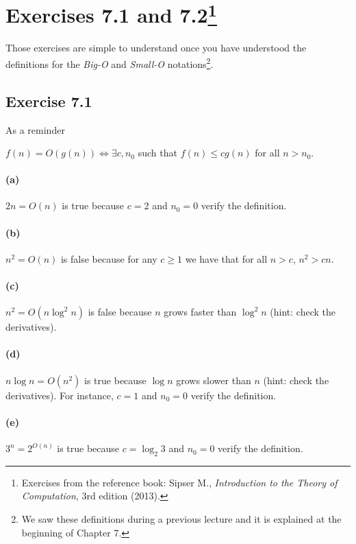 \section{Exercises 7.1 and 7.2\footnote{Exercises from the reference book: Sipser M.,
\emph{Introduction to the Theory of Computation}, 3rd edition (2013).}}
Those exercises are simple to understand once you have understood the definitions for the
\emph{Big-O} and \emph{Small-O} notations\footnote{We saw these definitions
during a previous lecture and it is explained at the beginning of Chapter 7.}.

\subsection{Exercise 7.1}
As a reminder
\begin{definition}
	\(f(n) = O(g(n)) \iff \exists c, n_0\) such that \(f(n) \le c g(n)\) for
	all \(n > n_0\).
\end{definition}

\paragraph{(a)}
\(2n = O(n)\)
is true because \(c = 2\) and \(n_0 = 0\) verify the definition.

\paragraph{(b)}
\(n^2 = O(n)\)
is false because for any \(c \ge 1\) we have that for all \(n > c\), \(n^2 > cn\).

\paragraph{(c)}
\(n^2 = O(n \log^2 n)\)
is false because $n$ grows faster than $\log^2 n$ (hint: check the derivatives).

\paragraph{(d)}
\(n \log n = O(n^2)\)
is true because $\log n$ grows slower than $n$ (hint: check the derivatives).
For instance, \(c = 1\) and \(n_0 = 0\) verify the definition.

\paragraph{(e)}
\(3^n = 2^{O(n)}\)
is true because \(c = \log_2 3\) and \(n_0 = 0\) verify the definition.

